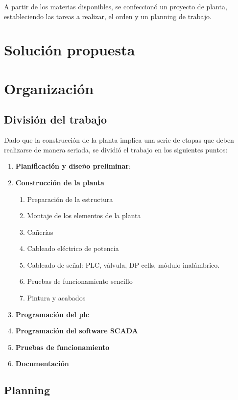 A partir de los materias disponibles, se confeccionó 
un proyecto de planta, estableciendo las tareas a realizar, el orden
y un planning de trabajo.

\section{Solución propuesta}
\label{sec:SolucionPropuesta}

\section{Organización}
\label{sec:Organizacion}
\subsection{División del trabajo}
Dado que la construcción de la planta implica una serie de etapas que
deben realizarse de manera seriada, se dividió el trabajo en los siguientes puntos:
\begin{enumerate}
 \item \textbf{Planificación y diseño preliminar}:
  \item \textbf{Construcción de la planta}
  \begin{enumerate}
   \item Preparación de la estructura
   \item Montaje de los elementos de la planta
   \item Cañerías
   \item Cableado eléctrico de potencia
   \item Cableado de señal: PLC, válvula, DP cells, módulo inalámbrico.
   \item Pruebas de funcionamiento sencillo
   \item Pintura y acabados
  \end{enumerate}
  \item \textbf{Programación del \gls{plc}}
  \item \textbf{Programación del software SCADA}
  \item \textbf{Pruebas de funcionamiento}
  \item \textbf{Documentación}
\end{enumerate}

\subsection{Planning}

